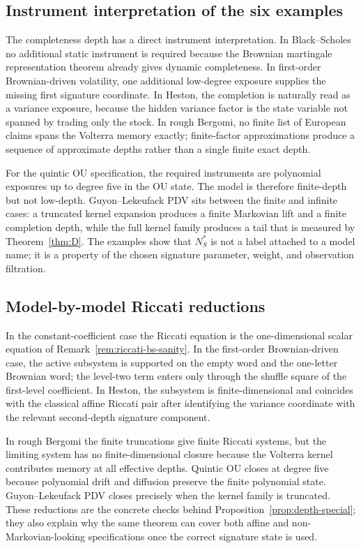\documentclass[11pt,oneside]{article}
\theoremstyle{plain}
\theoremstyle{definition}
\theoremstyle{remark}
\begin{document}
\subsection{Instrument interpretation of the six examples}
\label{subsec:instrument-interpretation-examples}
The completeness depth has a direct instrument interpretation. In Black--Scholes no additional static instrument is required because the Brownian martingale representation theorem already gives dynamic completeness. In first-order Brownian-driven volatility, one additional low-degree exposure supplies the missing first signature coordinate. In Heston, the completion is naturally read as a variance exposure, because the hidden variance factor is the state variable not spanned by trading only the stock. In rough Bergomi, no finite list of European claims spans the Volterra memory exactly; finite-factor approximations produce a sequence of approximate depths rather than a single finite exact depth.

For the quintic OU specification, the required instruments are polynomial exposures up to degree five in the OU state. The model is therefore finite-depth but not low-depth. Guyon--Lekeufack PDV sits between the finite and infinite cases: a truncated kernel expansion produces a finite Markovian lift and a finite completion depth, while the full kernel family produces a tail that is measured by Theorem~\ref{thm:D}. The examples show that $N_S^\ast$ is not a label attached to a model name; it is a property of the chosen signature parameter, weight, and observation filtration.

\subsection{Model-by-model Riccati reductions}
\label{subsec:model-riccati-reductions}
In the constant-coefficient case the Riccati equation is the one-dimensional scalar equation of Remark~\ref{rem:riccati-bs-sanity}. In the first-order Brownian-driven case, the active subsystem is supported on the empty word and the one-letter Brownian word; the level-two term enters only through the shuffle square of the first-level coefficient. In Heston, the subsystem is finite-dimensional and coincides with the classical affine Riccati pair after identifying the variance coordinate with the relevant second-depth signature component.

In rough Bergomi the finite truncations give finite Riccati systems, but the limiting system has no finite-dimensional closure because the Volterra kernel contributes memory at all effective depths. Quintic OU closes at degree five because polynomial drift and diffusion preserve the finite polynomial state. Guyon--Lekeufack PDV closes precisely when the kernel family is truncated. These reductions are the concrete checks behind Proposition~\ref{prop:depth-special}; they also explain why the same theorem can cover both affine and non-Markovian-looking specifications once the correct signature state is used.
\end{document}
